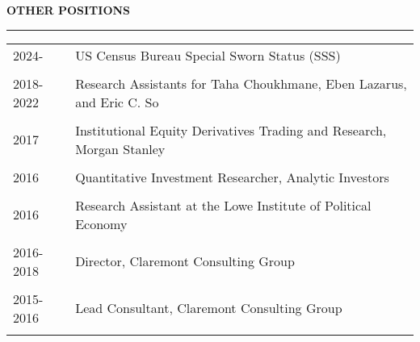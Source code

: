 \documentclass[a4paper, 10pt]{article}
\newcommand{\cvsec}[1]
{
	\needspace{2\baselineskip}
	\noindent \textbf{#1}
	
	\vspace{2pt}
	
	\hrule
	
	\bigskip
}
\newcommand{\cvitem}[2]{#1 & #2 \\ & \\}
\newenvironment{cvchrono}[1]
{
	\cvsec{#1}
	\begin{tabu} to \linewidth {X[1,l]X[6,l]} 
}
{
	\end{tabu}
}
\begin{document}
\begin{cvchrono}{OTHER POSITIONS}
	\cvitem{2024-}{US Census Bureau Special Sworn Status (SSS)}
	\cvitem{2018-2022}{Research Assistants for Taha Choukhmane, Eben Lazarus, and Eric C. So}
	\cvitem{2017}{Institutional Equity Derivatives Trading and Research, Morgan Stanley}
	\cvitem{2016}{Quantitative Investment Researcher, Analytic Investors}
	\cvitem{2016}{Research Assistant at the Lowe Institute of Political Economy}
	\cvitem{2016-2018}{Director, Claremont Consulting Group}
	\cvitem{2015-2016}{Lead Consultant, Claremont Consulting Group}
\end{cvchrono}

\end{document}
